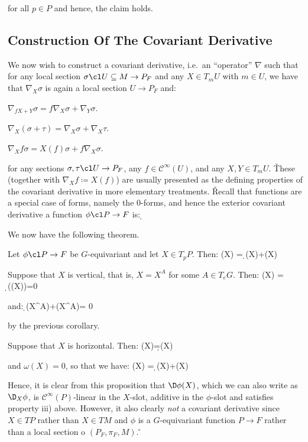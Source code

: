for all $p\in P$ and hence, the claim holds.
\eq

\subsection{Construction Of The Covariant Derivative}

We now wish to construct a covariant derivative, i.e.\ an ``operator'' $\nabla$ such that for any local section
$\sigma \cl U \subseteq M \to P_F$ and any $X\in T_m U$ with $m\in U$, we have that $\nabla_X \sigma$ is again a
local section $U\to P_F$ and:
\ben[label=\roman*)]
\item $\nabla_{fX+Y}\sigma = f\nabla_{X}\sigma+\nabla_{Y}\sigma$.
\item $\nabla_X(\sigma+\tau) = \nabla_X\sigma+\nabla_X\tau$.
\item $\nabla_X f\sigma = X(f)\sigma+f\nabla_X\sigma$.
\een

for any sections $\sigma,\tau\cl U\to P_F$, any $f\in \mathcal{C}^{\infty} (U)$, and any $X,Y\in T_m U$. \v

These (together with $\nabla_X f \coloneqq X(f)$) are usually presented as the defining properties of the covariant
derivative in more elementary treatments. \v

Recall that functions are a special case of forms, namely the $0$-forms, and hence the exterior covariant derivative
a function $\phi\cl P\to F$ is:
\bse
\D\phi \coloneqq \d \phi \circ \hor
\ese

We now have the following theorem.

\bt[]
Let $\phi\cl P\to F$ be $G$-equivariant and let $X\in T_p P$. Then:
\bse
\D\phi(X) = \d\phi(X)+\omega(X)\lacts \phi
\ese
\et

\bq
\ben[label=(\alph*)]
\item Suppose that $X$ is vertical, that is, $X=X^A$ for some $A\in T_e G$. Then:
\bse
\D\phi(X) = \d\phi(\hor(X))=0
\ese

and:
\bse
\d\phi(X^A)+\omega(X^A)\lacts \phi = 0
\ese

by the previous corollary.
\item Suppose that $X$ is horizontal. Then:
\bse
\D\phi(X)=\d\phi(X)
\ese

and $\omega(X)=0$, so that we have:
\bse
\D\phi(X) = \d\phi(X)+\omega(X)\lacts \phi\qedhere
\ese
\een
\eq

Hence, it is clear from this proposition that $\D\phi(X)$, which we can also write as $\D_X\phi$, is
$\mathcal{C}^{\infty}(P)$-linear in the $X$-slot, additive in the $\phi$-slot and satisfies property iii) above.
However, it also clearly \emph{not} a covariant derivative since $X\in TP$ rather than $X\in TM$ and $\phi$ is a
$G$-equivariant function $P\to F$ rather than a local section o $(P_F,\pi_F, M)$. \v

